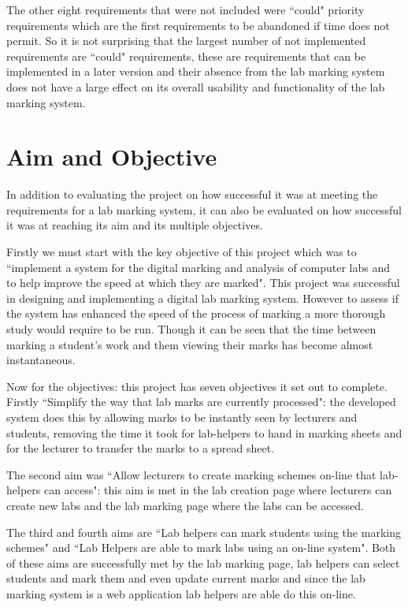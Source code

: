 \documentclass[11pt]{report}
\begin{document}
The other eight requirements that were not included were ``could" priority requirements which are the first requirements to be abandoned if time does not permit. So it is not surprising that the largest number of not implemented requirements are ``could" requirements, these are requirements that can be implemented in a later version and their absence from the lab marking system does not have a large effect on its overall usability and functionality of the lab marking system.


\section{Aim and Objective}

In addition to evaluating the project on how successful it was at meeting the requirements for a lab marking system, it can also be evaluated on how successful it was at reaching its aim and its multiple objectives.

Firstly we must start with the key objective of this project which was to ``implement  a  system  for  the  digital  marking  and analysis of computer labs and to help improve the speed at which they are marked". This project was successful in designing and implementing a digital lab marking system. However to assess if the system has enhanced the speed of the process of marking a more thorough study would require to be run. Though it can be seen that the time between marking a student's work and them viewing their marks has become almost instantaneous.

Now for the objectives: this project has seven objectives it set out to complete. Firstly ``Simplify the way that lab marks are currently processed": the developed system does this by allowing marks to be instantly seen by lecturers and students, removing the time it took for lab-helpers to hand in marking  sheets and for the lecturer to transfer the marks to a spread sheet.

The second aim was ``Allow lecturers to create marking schemes on-line that lab-helpers can access": this aim is met in the lab creation page where lecturers can create new labs and the lab marking page where the labs can be accessed.

The third and fourth aims are ``Lab helpers can mark students using the marking schemes" and ``Lab Helpers are able to mark labs using an on-line system". Both of these aims are successfully met by the lab marking page, lab helpers can select students and mark them and even update current marks and since the lab marking system is a web application lab helpers are able do this on-line.
\end{document}
